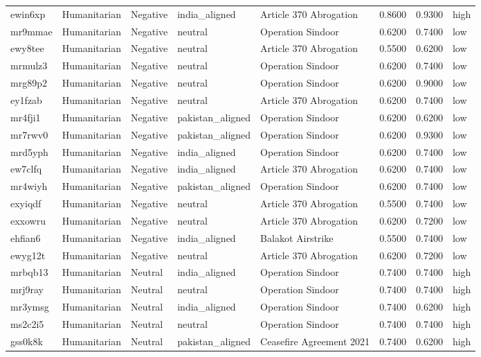 \begin{longtable}{lllllrrl}
ewin6xp & Humanitarian & Negative & india\_aligned & Article 370 Abrogation & 0.8600 & 0.9300 & high \\
mr9mmae & Humanitarian & Negative & neutral & Operation Sindoor & 0.6200 & 0.7400 & low \\
ewy8tee & Humanitarian & Negative & neutral & Article 370 Abrogation & 0.5500 & 0.6200 & low \\
mrmulz3 & Humanitarian & Negative & neutral & Operation Sindoor & 0.6200 & 0.7400 & low \\
mrg89p2 & Humanitarian & Negative & neutral & Operation Sindoor & 0.6200 & 0.9000 & low \\
ey1fzab & Humanitarian & Negative & neutral & Article 370 Abrogation & 0.6200 & 0.7400 & low \\
mr4fji1 & Humanitarian & Negative & pakistan\_aligned & Operation Sindoor & 0.6200 & 0.6200 & low \\
mr7rwv0 & Humanitarian & Negative & pakistan\_aligned & Operation Sindoor & 0.6200 & 0.9300 & low \\
mrd5yph & Humanitarian & Negative & india\_aligned & Operation Sindoor & 0.6200 & 0.7400 & low \\
ew7clfq & Humanitarian & Negative & india\_aligned & Article 370 Abrogation & 0.6200 & 0.7400 & low \\
mr4wiyh & Humanitarian & Negative & pakistan\_aligned & Operation Sindoor & 0.6200 & 0.7400 & low \\
exyiqdf & Humanitarian & Negative & neutral & Article 370 Abrogation & 0.5500 & 0.7400 & low \\
exxowru & Humanitarian & Negative & neutral & Article 370 Abrogation & 0.6200 & 0.7200 & low \\
ehfian6 & Humanitarian & Negative & india\_aligned & Balakot Airstrike & 0.5500 & 0.7400 & low \\
ewyg12t & Humanitarian & Negative & neutral & Article 370 Abrogation & 0.6200 & 0.7200 & low \\
mrbqb13 & Humanitarian & Neutral & india\_aligned & Operation Sindoor & 0.7400 & 0.7400 & high \\
mrj9ray & Humanitarian & Neutral & neutral & Operation Sindoor & 0.7400 & 0.7400 & high \\
mr3ymsg & Humanitarian & Neutral & india\_aligned & Operation Sindoor & 0.7400 & 0.6200 & high \\
ms2c2i5 & Humanitarian & Neutral & neutral & Operation Sindoor & 0.7400 & 0.7400 & high \\
gss0k8k & Humanitarian & Neutral & pakistan\_aligned & Ceasefire Agreement 2021 & 0.7400 & 0.6200 & high \\

\end{longtable}
